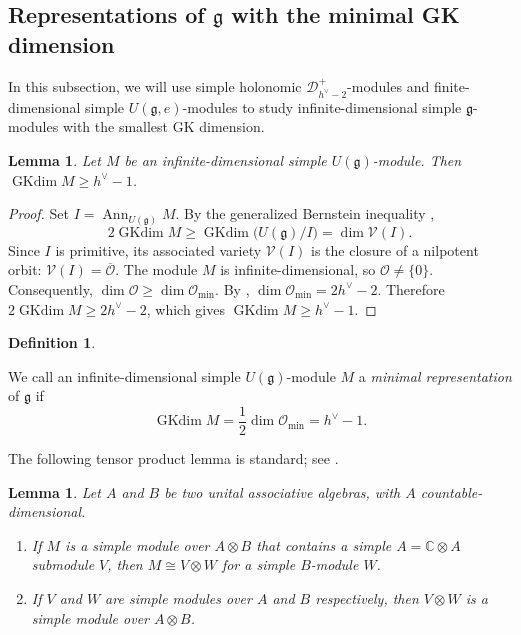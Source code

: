 \documentclass[12pt,a4paper]{amsart}
\numberwithin{equation}{section}
\newtheorem{lemma}[theorem]{Lemma}
\theoremstyle{definition}
\newtheorem{definition}[theorem]{Definition}
\theoremstyle{remark}
\newcommand{\C}{\mathbb{C}}
\newcommand{\g}{\mathfrak g}
\newcommand{\D}{\mathcal D}
\begin{document}
\subsection{\texorpdfstring{Representations of $\g$ with the minimal GK dimension}{Representations with the minimal GK dimension}}

In this subsection, we will use simple holonomic $\D^+_{h^\vee-2}$-modules and finite-dimensional simple $U(\g,e)$-modules to study infinite-dimensional simple $\g$-modules with the smallest GK dimension.

\begin{lemma} Let $M$ be an infinite-dimensional simple $U(\mathfrak g)$-module. Then $\operatorname{GKdim}M
\geq h^{\vee}-1$.
\end{lemma}

\begin{proof}
Set
$I=\operatorname{Ann}_{U(\mathfrak g)}M$.
By the generalized Bernstein inequality \cite[Section~1.2]{Losev2017},
\[
2\operatorname{GKdim}M
\geq
\operatorname{GKdim}\bigl(U(\mathfrak g)/I\bigr)
=
\dim\mathcal V(I).
\]
Since $I$ is primitive, its associated variety $\mathcal V(I)$ \cite{Joseph1,Joseph2} is the closure of a
nilpotent orbit:
$\mathcal V(I)=\overline{\mathcal O}$.
The module $M$ is infinite-dimensional, so $\mathcal O\neq\{0\}$.
Consequently,
$\dim\mathcal O\geq\dim\mathcal O_{\min}$.
By \cite{W1},
$\dim\mathcal O_{\min}=2h^\vee-2$.
Therefore
$2\operatorname{GKdim}M
\geq
2h^\vee-2$,
which gives
$\operatorname{GKdim}M\geq h^\vee-1$.
\end{proof}

\begin{definition}\label{def:minimal-representation}

We call an infinite-dimensional simple $U(\mathfrak g)$-module $M$
 a \emph{minimal representation} of
$\mathfrak g$ if
\[
\operatorname{GKdim}M
=
\frac{1}{2}\dim\mathcal O_{\min}=h^{\vee}-1.
\]
\end{definition}

The following tensor product lemma is standard; see
\cite[Lemma~3.6]{XL}.

\begin{lemma}\label{tensor}
Let $A$ and $B$ be two unital associative algebras, with \(A\)
countable-dimensional.
\begin{enumerate}
\item If $M$ is a simple module over $A\otimes B$ that contains a simple $A=\C\otimes A$ submodule $V$, then $M \cong V\otimes W$ for a simple $B$-module $W$.
\item If $V$ and $W$ are simple modules over $A$ and $B$ respectively, then $V\otimes W$ is a simple module over $A\otimes B$.
\end{enumerate}
\end{lemma}
\end{document}
